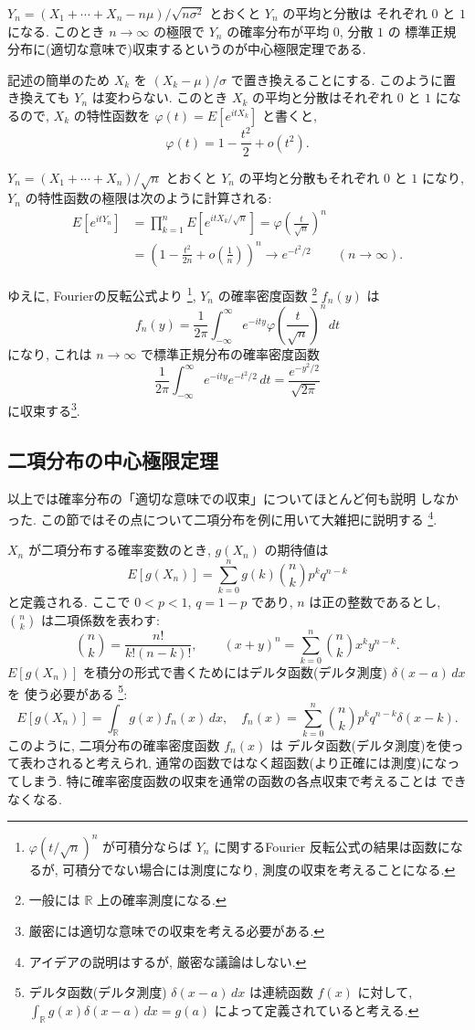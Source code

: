\documentclass[12pt,twoside]{jarticle}
\newcommand\R{{\mathbb R}} %
\theoremstyle{jplain}
\theoremstyle{jplain}
\theoremstyle{jplain}
\numberwithin{theorem}{section}
\numberwithin{equation}{section}
\numberwithin{figure}{section}
\numberwithin{table}{section}
\begin{document}
$Y_n=(X_1+\cdots+X_n-n\mu)/\sqrt{n\sigma^2}$ とおくと $Y_n$ の平均と分散は
それぞれ $0$ と $1$ になる.
このとき $n\to\infty$ の極限で $Y_n$ の確率分布が平均 $0$, 分散 $1$ の
標準正規分布に(適切な意味で)収束するというのが中心極限定理である.

記述の簡単のため $X_k$ を $(X_k-\mu)/\sigma$ で置き換えることにする. 
このように置き換えても $Y_n$ は変わらない.
このとき $X_k$ の平均と分散はそれぞれ $0$ と $1$ になるので, 
$X_k$ の特性函数を $\varphi(t)=E[e^{itX_k}]$ と書くと,
\[
\varphi(t) = 1 - \frac{t^2}{2} + o(t^2).
\]

$Y_n=(X_1+\cdots+X_n)/\sqrt{n}$ とおくと 
$Y_n$ の平均と分散もそれぞれ $0$ と $1$ になり, 
$Y_n$ の特性函数の極限は次のように計算される:
\begin{align*}
E[e^{itY_n}]
&=\prod_{k=1}^n E[e^{itX_k/\sqrt{n}}]
=\varphi\left(\frac{t}{\sqrt{n}}\right)^n
\\ &
=\left( 1 - \frac{t^2}{2n} + o\left(\frac{1}{n}\right) \right)^n
\longrightarrow e^{-t^2/2}
\qquad (n\to\infty).
\end{align*}

ゆえに, Fourierの反転公式より%
\footnote{$\varphi(t/\sqrt{n})^n$ が可積分ならば 
$Y_n$ に関するFourier 反転公式の結果は函数になるが, 
可積分でない場合には測度になり, 測度の収束を考えることになる.}, 
$Y_n$ の確率密度函数%
\footnote{一般には $\R$ 上の確率測度になる.}
$f_n(y)$ は
\[
f_n(y) 
= \frac{1}{2\pi}\int_{-\infty}^\infty 
  e^{-ity}\varphi\left(\frac{t}{\sqrt{n}}\right)^n\,dt
\]
になり, これは $n\to\infty$ で標準正規分布の確率密度函数
\[
\frac{1}{2\pi}\int_{-\infty}^\infty e^{-ity}e^{-t^2/2}\,dt
=\frac{e^{-y^2/2}}{\sqrt{2\pi}}
\]
に収束する\footnote{厳密には適切な意味での収束を考える必要がある.}.


\subsection{二項分布の中心極限定理}

以上では確率分布の「適切な意味での収束」についてほとんど何も説明
しなかった. この節ではその点について二項分布を例に用いて大雑把に説明する%
\footnote{アイデアの説明はするが, 厳密な議論はしない.}.

$X_n$ が二項分布する確率変数のとき, $g(X_n)$ の期待値は
\[
E[g(X_n)] = \sum_{k=0}^n g(k) \binom{n}{k}p^k q^{n-k}
\]
と定義される. ここで $0<p<1$, $q=1-p$ であり, $n$ は正の整数であるとし, 
$\binom{n}{k}$ は二項係数を表わす:
\[
\binom{n}{k}
=\frac{n!}{k!(n-k)!}, \qquad
(x+y)^n
=\sum_{k=0}^n \binom{n}{k} x^k y^{n-k}.
\]
$E[g(X_n)]$ を積分の形式で書くためにはデルタ函数(デルタ測度) $\delta(x-a)\,dx$ を
使う必要がある%
\footnote{デルタ函数(デルタ測度) $\delta(x-a)\,dx$ は連続函数 $f(x)$ に対して, 
$\int_\R g(x)\delta(x-a)\,dx = g(a)$ によって定義されていると考える.}: 
\[
E[g(X_n)] = \int_\R g(x)f_n(x)\,dx,
\quad
f_n(x) = \sum_{k=0}^n\binom{n}{k}p^k q^{n-k}\delta(x-k).
\]
このように, 二項分布の確率密度函数 $f_n(x)$ は
デルタ函数(デルタ測度)を使って表わされると考えられ,  
通常の函数ではなく超函数(より正確には測度)になってしまう.
特に確率密度函数の収束を通常の函数の各点収束で考えることは
できなくなる. 
\end{document}
